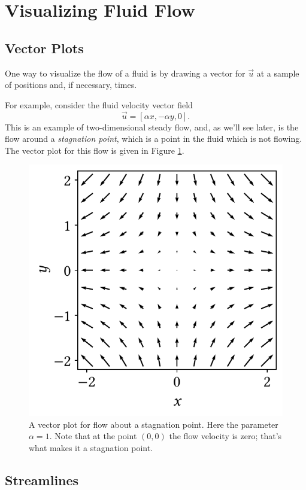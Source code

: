 %
%
%

\section{Visualizing Fluid Flow}

%
%

\subsection{Vector Plots}

One way to visualize the flow of a fluid is by drawing a vector for $\vec{u}$ at a sample of positions and, if necessary, times.

\begin{example}
\label{ex_stag_point1}
For example, consider the fluid velocity vector field
\begin{equation}
\label{eq_stag}
\vec{u} = [\alpha x, -\alpha y, 0].
\end{equation}
This is an example of two-dimensional steady flow, and, as we'll see later, is the flow around a \emph{stagnation point}, which is a point in the fluid which is not flowing.  The vector plot for this flow is given in Figure \ref{fig_vector_plot}. 
\end{example}

\begin{figure}
\centering\includegraphics[width=0.5\linewidth]{Figures/Chapter1/fig_vector_plot}
\caption{A vector plot for flow about a stagnation point.  Here the parameter $\alpha = 1$.  Note that at the point $(0,0)$ the flow velocity is zero; that's what makes it a stagnation point. }
\label{fig_vector_plot}
\end{figure}



\subsection{Streamlines}

